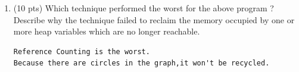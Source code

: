 \documentclass[10pt]{article}
\begin{document}
\begin{enumerate}
\begin{enumerate}
  \item (10 pts) Which technique performed the worst for the above program ? Describe why the technique failed to
reclaim the memory occupied by one or more heap variables which are no longer reachable.


\begin{verbatim}
Reference Counting is the worst. 
Because there are circles in the graph,it won't be recycled.
\end{verbatim}


\end{enumerate}
\end{enumerate}
\end{document}
